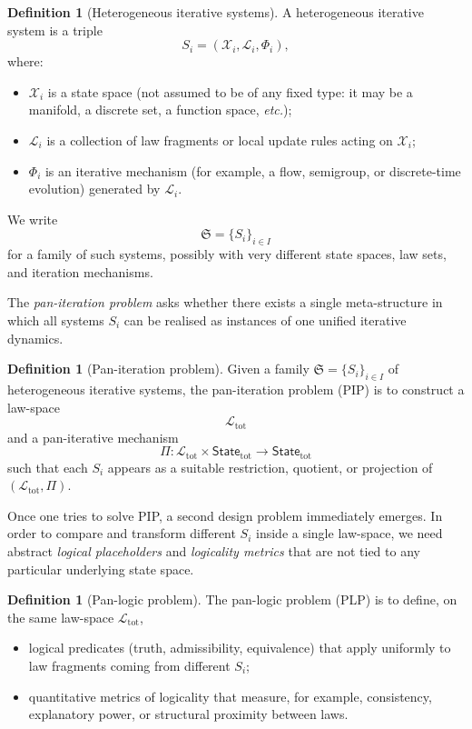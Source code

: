 \documentclass[11pt]{book}
\theoremstyle{plain}
\theoremstyle{definition}
\newtheorem{definition}[theorem]{Definition} \theoremstyle{remark}
\begin{document}
\begin{definition}[Heterogeneous iterative systems]
A heterogeneous iterative system is a triple
\[
  S_i = (\mathcal{X}_i,\mathcal{L}_i,\Phi_i),
\]
where:
\begin{itemize}
  \item $\mathcal{X}_i$ is a state space (not assumed to be of any
    fixed type: it may be a manifold, a discrete set, a function
    space, \emph{etc.});
  \item $\mathcal{L}_i$ is a collection of law fragments or local
    update rules acting on $\mathcal{X}_i$;
  \item $\Phi_i$ is an iterative mechanism (for example, a flow,
    semigroup, or discrete-time evolution) generated by
    $\mathcal{L}_i$.
\end{itemize}
We write
\[
  \mathfrak{S} = \{S_i\}_{i\in I}
\]
for a family of such systems, possibly with very different state
spaces, law sets, and iteration mechanisms.
\end{definition}

The \emph{pan-iteration problem} asks whether there exists a single
meta-structure in which all systems $S_i$ can be realised as instances
of one unified iterative dynamics.

\begin{definition}[Pan-iteration problem]
Given a family $\mathfrak{S} = \{S_i\}_{i\in I}$ of heterogeneous
iterative systems, the pan-iteration problem (PIP) is to construct a
law-space
\[
  \mathcal{L}_{\mathrm{tot}}
\]
and a pan-iterative mechanism
\[
  \Pi:\mathcal{L}_{\mathrm{tot}}\times\mathsf{State}_{\mathrm{tot}}
  \longrightarrow \mathsf{State}_{\mathrm{tot}}
\]
such that each $S_i$ appears as a suitable restriction, quotient, or
projection of $(\mathcal{L}_{\mathrm{tot}},\Pi)$.
\end{definition}

Once one tries to solve PIP, a second design problem immediately
emerges. In order to compare and transform different $S_i$ inside a
single law-space, we need abstract \emph{logical placeholders} and
\emph{logicality metrics} that are not tied to any particular
underlying state space.

\begin{definition}[Pan-logic problem]
The pan-logic problem (PLP) is to define, on the same law-space
$\mathcal{L}_{\mathrm{tot}}$,
\begin{itemize}
  \item logical predicates (truth, admissibility, equivalence) that
    apply uniformly to law fragments coming from different $S_i$;
  \item quantitative metrics of logicality that measure, for example,
    consistency, explanatory power, or structural proximity between
    laws.
\end{itemize}
\end{definition}
\end{document}

